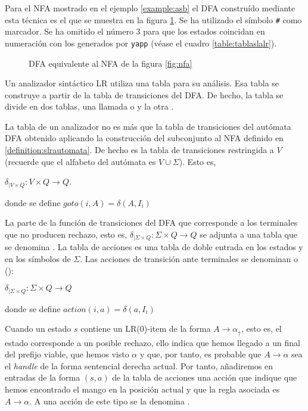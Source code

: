 Para el NFA mostrado en el ejemplo \ref{example:asb} el DFA construído mediante esta
técnica es el que se muestra en la figura \ref{fig:dfa}. Se ha utilizado el símbolo
\verb|#| como marcador. Se ha omitido el número 3 para que los estados coincidan
en numeración con los generados por \verb|yapp| (véase el cuadro
\ref{table:tablaslalr}).

\begin{center}
\begin{figure}
\centerline{}
\caption{DFA equivalente al NFA de la figura \ref{fig:nfa}}
\label{fig:dfa}
\end{figure}
\end{center}

Un analizador sintáctico LR utiliza una tabla para su análisis.
Esa tabla se construye a partir de la tabla de transiciones del DFA.
De hecho, la tabla se divide en dos tablas, una llamada 
 o  y la otra
.

La tabla  de un analizador 
no es más que la tabla de transiciones del autómata DFA 
obtenido aplicando la construcción del subconjunto al NFA
definido en \ref{definition:slrautomata}. De hecho es la tabla
de transiciones restringida a $V$ (recuerde que el alfabeto del
autómata es $V \cup \Sigma$).
Esto es, 

\begin{center}
$\delta_{| V \times Q} :  V \times Q \rightarrow Q$. 

donde se define $goto(i, A) = \delta(A,I_i)$
\end{center}

La parte de la función de transiciones
del DFA que corresponde a los terminales que no producen rechazo, 
esto es, $\delta_{| \Sigma \times Q} :  \Sigma \times Q \rightarrow Q$
se adjunta a una tabla que se denomina .
La tabla de acciones es una tabla de doble entrada en los estados
y en los símbolos de $\Sigma$.
Las acciones de transición ante terminales 
se denominan  o ():

\begin{center}
$\delta_{| \Sigma \times Q} :  \Sigma \times Q \rightarrow Q$

donde se define $action(i, a) = \delta(a,I_i)$
\end{center}

Cuando un estado $s$ contiene un LR(0)-item de la forma 
$A \rightarrow \alpha_\uparrow$, 
esto es, el estado corresponde a un posible rechazo,
ello indica que hemos llegado a un final del prefijo viable, que hemos
visto $\alpha$ y que, por tanto, es probable que $A \rightarrow \alpha$
sea el \emph{handle} de la forma sentencial derecha actual. Por tanto,
añadiremos en entradas de la forma $(s,a)$ de la tabla de acciones 
una acción que indique que hemos encontrado el mango en la 
posición actual y que la regla asociada es $A \rightarrow \alpha$.
A una acción de este tipo se la denomina .

